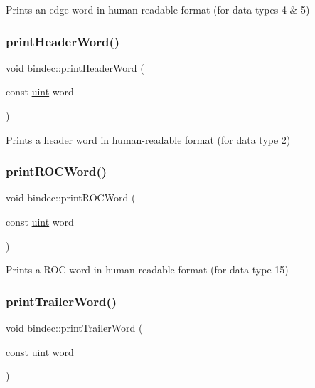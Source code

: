 Prints an edge word in human-\/readable format (for data types 4 \& 5) 

\mbox{\label{namespacebindec_a185046fdda824c32d42f246df1f1bbba}} 
\subsubsection{\texorpdfstring{print\+Header\+Word()}{printHeaderWord()}}
{\footnotesize\ttfamily void bindec\+::print\+Header\+Word (\begin{DoxyParamCaption}\item[{const \hyperlink{namespacebindec_a61700e6ffcfc677215bfdf223803e735}{uint}}]{word }\end{DoxyParamCaption})\hspace{0.3cm}{\ttfamily [inline]}}



Prints a header word in human-\/readable format (for data type 2) 

\mbox{\label{namespacebindec_ae47ffd422cb9936f6dfca77bc7c969cb}} 
\subsubsection{\texorpdfstring{print\+R\+O\+C\+Word()}{printROCWord()}}
{\footnotesize\ttfamily void bindec\+::print\+R\+O\+C\+Word (\begin{DoxyParamCaption}\item[{const \hyperlink{namespacebindec_a61700e6ffcfc677215bfdf223803e735}{uint}}]{word }\end{DoxyParamCaption})\hspace{0.3cm}{\ttfamily [inline]}}



Prints a R\+OC word in human-\/readable format (for data type 15) 

\mbox{\label{namespacebindec_a7d697577845df9e5e04a8fbbc118dcc5}} 
\subsubsection{\texorpdfstring{print\+Trailer\+Word()}{printTrailerWord()}}
{\footnotesize\ttfamily void bindec\+::print\+Trailer\+Word (\begin{DoxyParamCaption}\item[{const \hyperlink{namespacebindec_a61700e6ffcfc677215bfdf223803e735}{uint}}]{word }\end{DoxyParamCaption})\hspace{0.3cm}{\ttfamily [inline]}}



